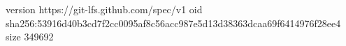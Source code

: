 version https://git-lfs.github.com/spec/v1
oid sha256:53916d40b3cd7f2cc0095af8c56acc987e5d13d38363dcaa69f6414976f28ee4
size 349692
